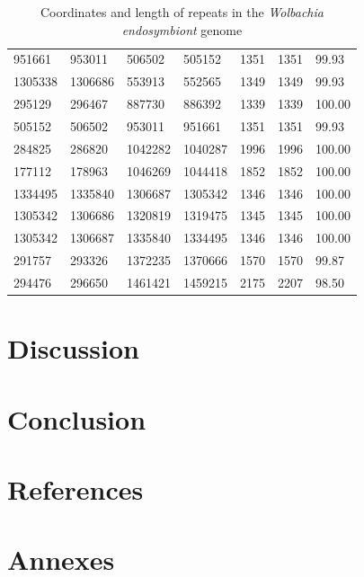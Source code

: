 \documentclass[12pt, twocolumn]{article}
\begin{document}
\begin{table}[h!]
{\begin{tabular}{|l|l|l|l|l|l|l|}
951661   & 953011   & 506502   & 505152   & 1351        & 1351        & 99.93          \\
1305338  & 1306686  & 553913   & 552565   & 1349        & 1349        & 99.93          \\
295129   & 296467   & 887730   & 886392   & 1339        & 1339        & 100.00         \\
505152   & 506502   & 953011   & 951661   & 1351        & 1351        & 99.93          \\
284825   & 286820   & 1042282  & 1040287  & 1996        & 1996        & 100.00         \\
177112   & 178963   & 1046269  & 1044418  & 1852        & 1852        & 100.00         \\
1334495  & 1335840  & 1306687  & 1305342  & 1346        & 1346        & 100.00         \\
1305342  & 1306686  & 1320819  & 1319475  & 1345        & 1345        & 100.00         \\
1305342  & 1306687  & 1335840  & 1334495  & 1346        & 1346        & 100.00         \\
291757   & 293326   & 1372235  & 1370666  & 1570        & 1570        & 99.87          \\
\rowcolor{red!10}
294476   & 296650   & 1461421  & 1459215  & 2175        & 2207        & 98.50         \\ \hline
\end{tabular}
\caption{Coordinates and length of repeats in the \textit{Wolbachia endosymbiont} genome}
\label{tab:repeatcoord}
}
\end{table}


\clearpage
\section{Discussion}
\section{Conclusion}
\clearpage

\section{References}


\newpage
\section{Annexes}
\label{sec:anx}
\setcounter{figure}{0}
\renewcommand{\thefigure}{\Alph{figure}}
 
\end{document}
